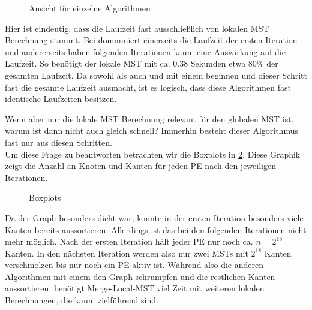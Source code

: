 \begin{figure}[H]
    \centering
    
    

    
   
    \caption{Ansicht für einzelne Algorithmen}
    \label{Explicit-dense-Img}
\end{figure}


Hier ist eindeutig, dass die Laufzeit fast ausschließlich von lokalen MST Berechnung stammt. Bei \boruvkaAllreduce domminiert einerseits die Laufzeit der ersten Iteration und andererseits haben folgenden Iterationen kaum eine Auswirkung auf die Laufzeit.
So benötigt der lokale MST mit ca. 0.38 Sekunden etwa 80\% der gesamten Laufzeit. Da sowohl \boruvkaAllreduce als auch \boruvkaThenMerge und \boruvkaMixedMerge mit einem \boruvkaStep beginnen und dieser Schritt fast die gesamte Laufzeit ausmacht, ist es logisch, dass diese Algorithmen fast identische Laufzeiten besitzen.


Wenn aber nur die lokale MST Berechnung relevant für den globalen MST ist, warum ist dann nicht auch \mergeMST gleich schnell? Immerhin besteht dieser Algorithmus fast nur aus diesen Schritten. \\
Um diese Frage zu beantworten betrachten wir die Boxplots in \cref{Boxplot-dense-Img}.
Diese Graphik zeigt die Anzahl an Knoten und Kanten für jeden PE nach den jeweiligen Iterationen.



\begin{figure}[H]
    \centering
    
    
    \caption{Boxplots}
    \label{Boxplot-dense-Img}
\end{figure}

Da der Graph besonders dicht war, konnte \mergeMST in der ersten Iteration besonders viele Kanten bereits aussortieren. Allerdings ist das bei den folgenden Iterationen nicht mehr möglich. Nach der ersten Iteration hält jeder PE nur noch ca. $n=2^{18}$ Kanten. In den nächsten Iteration werden also nur zwei MSTs mit $2^{18}$ Kanten verschmolzen bis nur noch ein PE aktiv ist.
Während also die anderen Algorithmen mit einem \boruvkaStep den Graph schrumpfen und die restlichen Kanten aussortieren, benötigt Merge-Local-MST viel Zeit mit weiteren lokalen Berechnungen, die kaum zielführend sind. 




